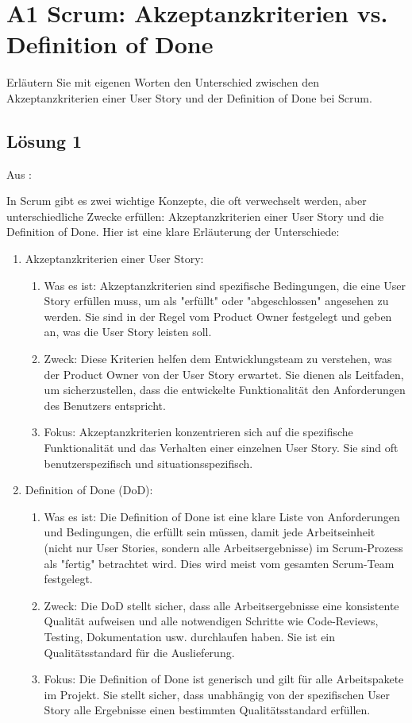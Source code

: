 \documentclass[main.tex]{subfiles}
\begin{document}
\section{A1 Scrum: Akzeptanzkriterien vs. Definition of Done}
Erläutern Sie mit eigenen Worten den Unterschied zwischen den Akzeptanzkriterien einer User Story und der Definition of Done bei Scrum.

\subsection{Lösung 1}

Aus \cite{openai2023chatgpt4}:

In Scrum gibt es zwei wichtige Konzepte, die oft verwechselt werden, aber unterschiedliche Zwecke erfüllen: Akzeptanzkriterien einer User Story und die Definition of Done. Hier ist eine klare Erläuterung der Unterschiede:


\renewcommand{\labelenumi}{\arabic{enumi}.}
\begin{enumerate}

\item Akzeptanzkriterien einer User Story:
\begin{enumerate}
   \item Was es ist: Akzeptanzkriterien sind spezifische Bedingungen, die eine User Story erfüllen muss, um als "erfüllt" oder "abgeschlossen" angesehen zu werden. Sie sind in der Regel vom Product Owner festgelegt und geben an, was die User Story leisten soll.
   \item Zweck: Diese Kriterien helfen dem Entwicklungsteam zu verstehen, was der Product Owner von der User Story erwartet. Sie dienen als Leitfaden, um sicherzustellen, dass die entwickelte Funktionalität den Anforderungen des Benutzers entspricht.
   \item Fokus: Akzeptanzkriterien konzentrieren sich auf die spezifische Funktionalität und das Verhalten einer einzelnen User Story. Sie sind oft benutzerspezifisch und situationsspezifisch.
\end{enumerate}
\item Definition of Done (DoD):
\begin{enumerate}
    \item Was es ist: Die Definition of Done ist eine klare Liste von Anforderungen und Bedingungen, die erfüllt sein müssen, damit jede Arbeitseinheit (nicht nur User Stories, sondern alle Arbeitsergebnisse) im Scrum-Prozess als "fertig" betrachtet wird. Dies wird meist vom gesamten Scrum-Team festgelegt.
    \item Zweck: Die DoD stellt sicher, dass alle Arbeitsergebnisse eine konsistente Qualität aufweisen und alle notwendigen Schritte wie Code-Reviews, Testing, Dokumentation usw. durchlaufen haben. Sie ist ein Qualitätsstandard für die Auslieferung.
    \item Fokus: Die Definition of Done ist generisch und gilt für alle Arbeitspakete im Projekt. Sie stellt sicher, dass unabhängig von der spezifischen User Story alle Ergebnisse einen bestimmten Qualitätsstandard erfüllen.
\end{enumerate}
\end{enumerate}
\end{document}

